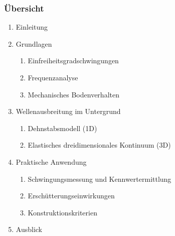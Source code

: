 \documentclass[hyperref={pdfpagemode=FullScreen, colorlinks=false}]{beamer}
\begin{document}
\begin{frame}
 \frametitle{Übersicht}
 \begin{enumerate}
  \item Einleitung
  \item Grundlagen
  \begin{enumerate}
  \item Einfreiheitsgradschwingungen %
  \item Frequenzanalyse
  \item Mechanisches Bodenverhalten %
  \end{enumerate}
  \item Wellenausbreitung im Untergrund
  \begin{enumerate}
  \item Dehnstabsmodell (1D)
  \item Elastisches dreidimensionales Kontinuum (3D) %
  \end{enumerate}
  \item Praktische Anwendung
  \begin{enumerate}
  \item Schwingungsmessung und Kennwertermittlung %
  \item Erschütterungseinwirkungen %
  \item Konstruktionskriterien %
  \end{enumerate}
  \item Ausblick
  \end{enumerate}

  
  
\end{frame}
\end{document}
